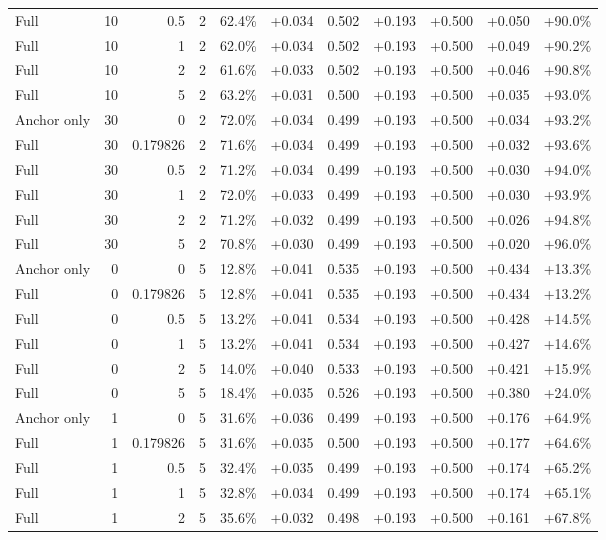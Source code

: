 \begin{table}[htbp]
\begin{tabular}{lrrrccccccc}
Full & 10 & 0.5 & 2 & 62.4\% & +0.034 & 0.502 & +0.193 & +0.500 & +0.050 & +90.0\% \\
Full & 10 & 1 & 2 & 62.0\% & +0.034 & 0.502 & +0.193 & +0.500 & +0.049 & +90.2\% \\
Full & 10 & 2 & 2 & 61.6\% & +0.033 & 0.502 & +0.193 & +0.500 & +0.046 & +90.8\% \\
Full & 10 & 5 & 2 & 63.2\% & +0.031 & 0.500 & +0.193 & +0.500 & +0.035 & +93.0\% \\
Anchor only & 30 & 0 & 2 & 72.0\% & +0.034 & 0.499 & +0.193 & +0.500 & +0.034 & +93.2\% \\
Full & 30 & 0.179826 & 2 & 71.6\% & +0.034 & 0.499 & +0.193 & +0.500 & +0.032 & +93.6\% \\
Full & 30 & 0.5 & 2 & 71.2\% & +0.034 & 0.499 & +0.193 & +0.500 & +0.030 & +94.0\% \\
Full & 30 & 1 & 2 & 72.0\% & +0.033 & 0.499 & +0.193 & +0.500 & +0.030 & +93.9\% \\
Full & 30 & 2 & 2 & 71.2\% & +0.032 & 0.499 & +0.193 & +0.500 & +0.026 & +94.8\% \\
Full & 30 & 5 & 2 & 70.8\% & +0.030 & 0.499 & +0.193 & +0.500 & +0.020 & +96.0\% \\
Anchor only & 0 & 0 & 5 & 12.8\% & +0.041 & 0.535 & +0.193 & +0.500 & +0.434 & +13.3\% \\
Full & 0 & 0.179826 & 5 & 12.8\% & +0.041 & 0.535 & +0.193 & +0.500 & +0.434 & +13.2\% \\
Full & 0 & 0.5 & 5 & 13.2\% & +0.041 & 0.534 & +0.193 & +0.500 & +0.428 & +14.5\% \\
Full & 0 & 1 & 5 & 13.2\% & +0.041 & 0.534 & +0.193 & +0.500 & +0.427 & +14.6\% \\
Full & 0 & 2 & 5 & 14.0\% & +0.040 & 0.533 & +0.193 & +0.500 & +0.421 & +15.9\% \\
Full & 0 & 5 & 5 & 18.4\% & +0.035 & 0.526 & +0.193 & +0.500 & +0.380 & +24.0\% \\
Anchor only & 1 & 0 & 5 & 31.6\% & +0.036 & 0.499 & +0.193 & +0.500 & +0.176 & +64.9\% \\
Full & 1 & 0.179826 & 5 & 31.6\% & +0.035 & 0.500 & +0.193 & +0.500 & +0.177 & +64.6\% \\
Full & 1 & 0.5 & 5 & 32.4\% & +0.035 & 0.499 & +0.193 & +0.500 & +0.174 & +65.2\% \\
Full & 1 & 1 & 5 & 32.8\% & +0.034 & 0.499 & +0.193 & +0.500 & +0.174 & +65.1\% \\
Full & 1 & 2 & 5 & 35.6\% & +0.032 & 0.498 & +0.193 & +0.500 & +0.161 & +67.8\% \\

\end{tabular}
\end{table}
